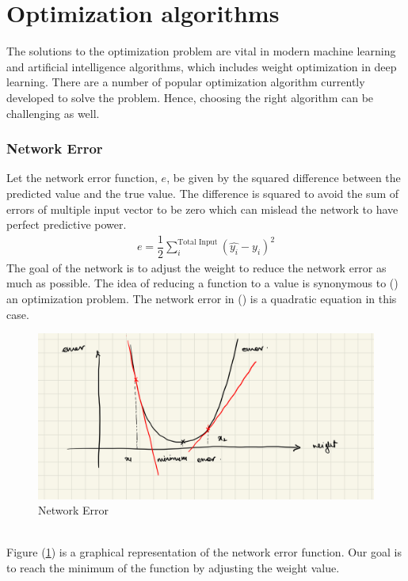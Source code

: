\section{Optimization algorithms}
The solutions to the optimization problem are vital in modern machine learning and artificial intelligence algorithms, which includes weight optimization in deep learning. There are a number of popular optimization algorithm currently developed to solve the problem. Hence, choosing the right algorithm can be challenging as well.
\subsubsection*{Network Error}
Let the network error function, $e$, be given by the squared difference between the predicted value and the true value. The difference is squared to avoid the sum of errors of multiple input vector to be zero which can mislead the network to have perfect predictive power.
\begin{align}
   e = \dfrac{1}{2}\sum^{\text{Total Input}}_i (\widehat{y_i}-y_i)^2
  \label{network_error}
\end{align}
The goal of the network is to adjust the weight to reduce the network error as much as possible. The idea of reducing a function to a value is synonymous to () an optimization problem. The network error in () is a quadratic equation in this case.\\
\begin{figure}[ht!]
  \centering
  \includegraphics[scale=0.15]{CHAPTER_2/c2_fig_network_error.jpeg}
  \caption{Network Error}
  \label{network_error_graph}
\end{figure}\\
Figure (\ref*{network_error_graph}) is a graphical representation of the network error function. Our goal is to reach the minimum of the function by adjusting the weight value.
